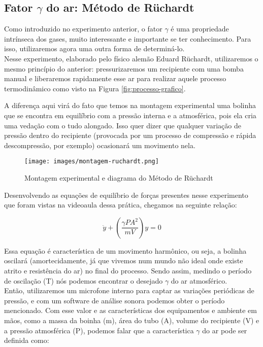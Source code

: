 \subsection{Fator $\gamma$ do ar: Método de Rüchardt}

Como introduzido no experimento anterior, o fator $\gamma$ é uma propriedade intrínseca dos gases, muito interessante e importante se ter conhecimento. Para isso, utilizaremos agora uma outra forma de determiná-lo.\\

Nesse experimento, elaborado pelo físico alemão Eduard Rüchardt, utilizaremos o mesmo princípio do anterior: pressurizaremos um recipiente com uma bomba manual e liberaremos rapidamente esse ar para realizar aquele processo termodinâmico como visto na Figura \ref{fig:processo-grafico}.

A diferença aqui virá do fato que temos na montagem experimental uma bolinha que se encontra em equilíbrio com a pressão interna e a atmosférica, pois ela cria uma vedação com o tudo alongado. Isso quer dizer que qualquer variação de pressão dentro do recipiente (provocada por um processo de compressão e rápida descompressão, por exemplo) ocasionará um movimento nela.

\begin{figure}[H]
  \centering
  \texttt{[image: images/montagem-ruchardt.png]}
  \caption{Montagem experimental e diagrama do Método de Rüchardt}
\end{figure}

Desenvolvendo as equações de equilíbrio de forças presentes nesse experimento que foram vistas na videoaula dessa prática, chegamos na seguinte relação:

\[ \ddot{y} + \left( \frac{\gamma P A^2}{m V} \right) y = 0 \]

Essa equação é característica de um movimento harmônico, ou seja, a bolinha oscilará (amortecidamente, já que vivemos num mundo não ideal onde existe atrito e resistência do ar) no final do processo. Sendo assim, medindo o período de oscilação (T) nós podemos encontrar o desejado $\gamma$ do ar atmosférico.\\

Então, utilizaremos um microfone interno para captar as variações periódicas de pressão, e com um software de análise sonora podemos obter o período mencionado. Com esse valor e as características dos equipamentos e ambiente em mãos, como a massa da boinha (m), área do tubo (A), volume do recipiente (V) e a pressão atmosférica (P), podemos falar que a característica $\gamma$ do ar pode ser definida como:

